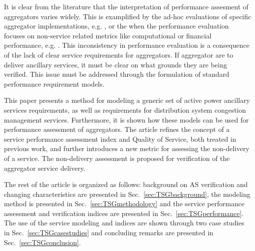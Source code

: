 It is clear from the literature that the interpretation of performance assesment of aggregators varies widely. This is examplified by the ad-hoc evaluations of specific aggregator implementations, e.g. \cite{vrettos2015integrating}, or the when the performance evaluation focuses on non-service related metrics like computational or financial performance, e.g. \cite{su2012performance,rahnama2014evaluation}. This inconsistency in performance evaluation is a consequence of the lack of clear service requirements for aggregators. If aggregator are to deliver ancillary services, it must be clear on what grounds they are being verified. This issue must be addressed through the formulation of standard performance requirement models.

This paper presents a method for modeling a generic set of active power ancillary services requirements, as well as requirements for distribution system congestion management services. Furthermore, it is shown how these models can be used for performance assessment of aggregators. The article refines the concept of a service performance assessment index and Quality of Service, both treated in previous work, and further introduces a new metric for assessing the non-delivery of a service. The non-delivery assessment is proposed for verification of the aggregator service delivery.

The rest of the article is organized as follows: background on AS verification and changing characteristics are presented in Sec.~\ref{sec:TSGbackground}, the modeling method is presented in Sec.~\ref{sec:TSGmethodology} and the service performance assessment and verification indices are presented in Sec.~\ref{sec:TSGperformance}. The use of the service modeling and indices are shown through two case studies in Sec.~\ref{sec:TSGcasestudies} and concluding remarks are presented in Sec.~\ref{sec:TSGconclusion}.
